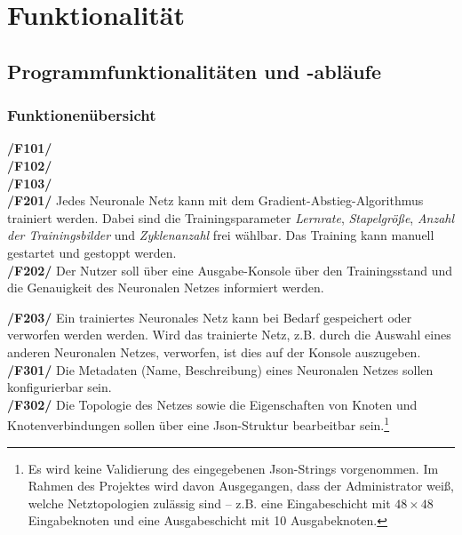 \chapter{Funktionalität}

\section{Programmfunktionalitäten und -abläufe}
\subsection{Funktionenübersicht}

\textbf{/F101/}\\[-0.2cm]

\textbf{/F102/}\\[-0.2cm]

\textbf{/F103/}\\[-0.2cm]

\textbf{/F201/} Jedes Neuronale Netz kann mit dem Gradient-Abstieg-Algorithmus trainiert werden. Dabei sind die Trainingsparameter \emph{Lernrate}, \emph{Stapelgröße}, \emph{Anzahl der Trainingsbilder} und \emph{Zyklenanzahl} frei wählbar. Das Training kann manuell gestartet und gestoppt werden.\\[-0.2cm]

\textbf{/F202/} Der Nutzer soll über eine Ausgabe-Konsole über den Trainingsstand und die Genauigkeit des Neuronalen Netzes informiert werden.

\textbf{/F203/} Ein trainiertes Neuronales Netz kann bei Bedarf gespeichert oder verworfen werden werden. Wird das trainierte Netz, z.B. durch die Auswahl eines anderen Neuronalen Netzes, verworfen, ist dies auf der Konsole auszugeben. \\[-0.2cm]

\textbf{/F301/} Die Metadaten (Name, Beschreibung) eines Neuronalen Netzes sollen konfigurierbar sein.\\[-0.2cm]

\textbf{/F302/} Die Topologie des Netzes sowie die Eigenschaften von Knoten und Knotenverbindungen sollen über eine Json-Struktur bearbeitbar sein.\footnote{Es wird keine Validierung des eingegebenen Json-Strings vorgenommen. Im Rahmen des Projektes wird davon Ausgegangen, dass der Administrator weiß, welche Netztopologien zulässig sind -- z.B. eine Eingabeschicht mit $48 \times 48$ Eingabeknoten und eine Ausgabeschicht mit 10 Ausgabeknoten.}\\[-0.2cm]

